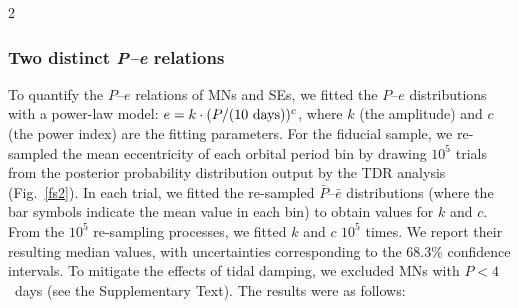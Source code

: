\documentclass[10pt]{article}
\begin{document}
\begin{multicols}{2}
\subsubsection*{Two distinct \emph{P--e} relations}
\noindent To quantify the $P$--$e$ relations of MNs and SEs, we fitted the $P$--$e$ distributions with a power-law model: $e = k\cdot(P/(10~{\rm days)})^c$, where $k$ (the amplitude) and $c$ (the power index) are the fitting parameters.
For the fiducial sample, we re-sampled the mean eccentricity of each orbital period bin by drawing $10^5$ trials from the posterior probability distribution output by the TDR analysis (Fig.~\ref{fs2}).
In each trial, we fitted the re-sampled $\bar{P}$--$\bar{e}$ distributions (where the bar symbols indicate the mean value in each bin) to obtain values for $k$ and $c$.
From the $10^5$ re-sampling processes, we fitted $k$ and $c$ $10^5$ times.
We report their resulting median values, with uncertainties corresponding to the 68.3\% confidence intervals.
To mitigate the effects of tidal damping, we excluded MNs with $P<4$~days (see the Supplementary Text).
The results were as follows:
\end{multicols}
\end{document}
